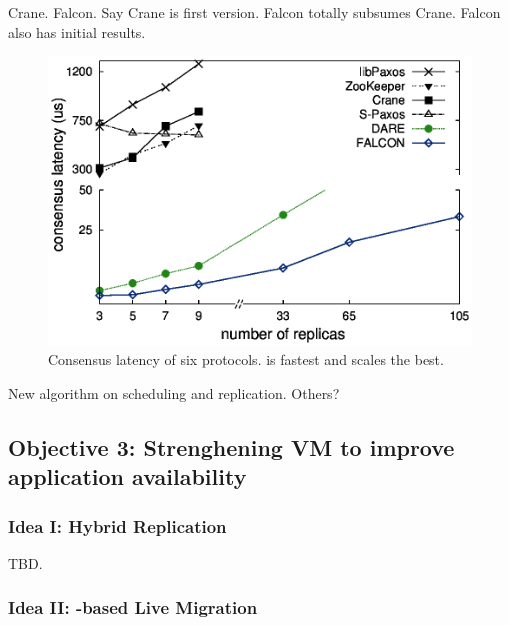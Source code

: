  Crane. Falcon. Say Crane is first version. Falcon 
totally subsumes Crane. Falcon also has initial results.

\begin{figure}[!htb]
\centering
\includegraphics[width=0.34\textheight]{figures/traditional_paxos_latency.ps}
        \vspace{0.1in}
        \caption{Consensus latency of six \paxos protocols. \falcon is fastest 
and scales the best.}
        \label{fig:scalability}
\end{figure}

 New algorithm on scheduling and replication. Others?

\vspace{-.15in}\subsection{Objective 3: 
Strenghening VM to improve application 
availability}\label{sec:defense}\vspace{-.075in}


\vspace{-.15in}\subsubsection{Idea I: Hybrid Replication} 
\label{sec:defense-arch}\vspace{-.075in}

TBD.

\vspace{-.15in}\subsubsection{Idea II: \paxos-based Live Migration} 
\label{sec:defense-arch}\vspace{-.075in}

